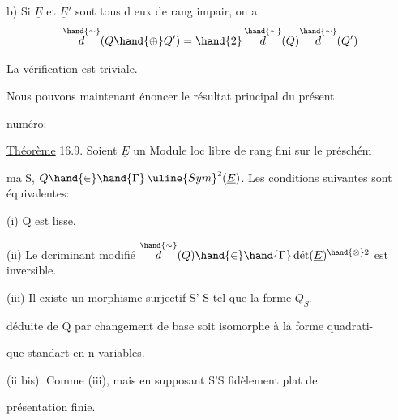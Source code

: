 b) Si $\underline{E}$ et $\underline{E}'$ sont tous d eux de rang impair, on a
\[ \overset{\hand{\sim}}{d}(Q \hand{\oplus} Q') = \hand{2}\,\overset{\hand{\sim}}{d}(Q)\overset{\hand{\sim}}{d}(Q') \]

La vérification est triviale.

Nous pouvons maintenant énoncer le résultat principal du présent

numéro:

\uline{Théorème} 16.9. Soient $\underline{E}$ un Module loc libre de rang fini sur le préschém

ma S, $Q \hand{\in}\hand{\Gamma}\,\uline{Sym}^2(\underline{E})$. Les conditions suivantes sont équivalentes:

(i) Q est lisse.

(ii) Le dcriminant modifié $\overset{\hand{\sim}}{d}(Q) \hand{\in}\hand{\Gamma}\,\text{dét}(\underline{E})^{\hand{\otimes}2}$ est inversible.

(iii)  Il existe un morphisme surjectif S' \quad S tel que la forme $Q_{S'}$

déduite de Q par changement de base soit isomorphe à la forme quadrati-%

que standart en n variables.

(ii bis). Comme (iii), mais en supposant S'\hand{$\rightarrow$}S fidèlement plat de

présentation finie.

